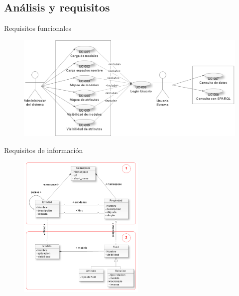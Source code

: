 \documentclass[spanish,xcolor=table,svgnames]{beamer}
\begin{document}
\subsection*{Análisis y requisitos}
\begin{frame}{Requisitos funcionales}
  \begin{figure}[H]
    \begin{center}
        \includegraphics[width=1.0\textwidth]{img/casouso.png}
    \end{center}
    \label{fig:cu1}
  \end{figure}
\end{frame}


\begin{frame}{Requisitos de información}
  \centering
    \begin{figure}[H]
      \begin{center}
          \includegraphics[width=0.54\textwidth]{img/diagrama_clases.png}
      \end{center}
      \label{fig:dia_clases}
    \end{figure}
\end{frame}
\end{document}
